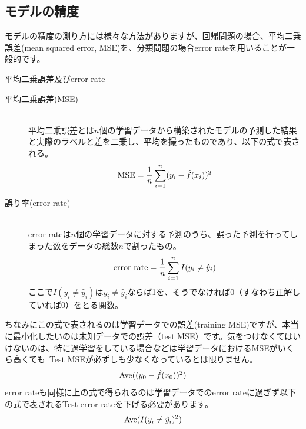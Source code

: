 \documentclass[uplatex]{jsarticle}
\begin{document}
\subsection{モデルの精度}
モデルの精度の測り方には様々な方法がありますが、回帰問題の場合、平均二乗誤差(mean squared error, MSE)を、分類問題の場合error rateを用いることが一般的です。
\begin{itembox}[l]{平均二乗誤差及びerror rate}
    \begin{description}
      \item [平均二乗誤差(MSE)]\mbox{}\\
      平均二乗誤差とは$n個の$学習データから構築されたモデルの予測した結果と実際のラベルと差を二乗し、平均を撮ったものであり、以下の式で表される。
      $${\rm MSE} = \frac{1}{n}\sum_{i=1}^n (y_i - \hat{f}(x_i))^2$$
      \item [誤り率(error rate)]\mbox{}\\
      error rateは$n$個の学習データに対する予測のうち、誤った予測を行ってしまった数をデータの総数$n$で割ったもの。
      $${\rm error\ rate} = \frac{1}{n}\sum_{i=1}^n I(y_i \neq \hat{y}_i)$$
      ここで$I(y_i \neq \hat{y}_i)$は$y_i \neq \hat{y}_i$ならば1を、そうでなければ0（すなわち正解していれば0）をとる関数。
    \end{description}
\end{itembox}
ちなみにこの式で表されるのは学習データでの誤差(training MSE)ですが、本当に最小化したいのは未知データでの誤差（test MSE）です。気をつけなくてはいけないのは、特に過学習をしている場合などは学習データにおけるMSEがいくら高くても\
Test MSEが必ずしも少なくなっているとは限りません。
$${\rm Ave}((y_0 - \hat{f}(x_0))^2)$$
error rateも同様に上の式で得られるのは学習データでのerror rateに過ぎず以下の式で表されるTest error rateを下げる必要があります。
$${\rm Ave}(I(y_i \neq \hat{y}_i)^2)$$
\end{document}
